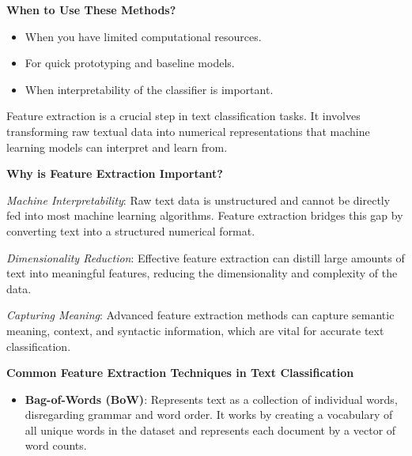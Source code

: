 \documentclass[
  letterpaper,
  DIV=11,
  numbers=noendperiod]{scrreprt}
\providecommand{\tightlist}{%
  \setlength{\itemsep}{0pt}\setlength{\parskip}{0pt}}\usepackage{longtable,booktabs,array}
\begin{document}
\textbf{When to Use These Methods?}

\begin{itemize}
\tightlist
\item
  When you have limited computational resources.
\item
  For quick prototyping and baseline models.
\item
  When interpretability of the classifier is important.
\end{itemize}

\begin{tcolorbox}[enhanced jigsaw, opacitybacktitle=0.6, breakable, title=\textcolor{quarto-callout-note-color}{\faInfo}\hspace{0.5em}{On Feature Extraction}, arc=.35mm, colframe=quarto-callout-note-color-frame, colbacktitle=quarto-callout-note-color!10!white, left=2mm, bottomrule=.15mm, opacityback=0, toprule=.15mm, bottomtitle=1mm, toptitle=1mm, titlerule=0mm, leftrule=.75mm, colback=white, rightrule=.15mm, coltitle=black]

Feature extraction is a crucial step in text classification tasks. It
involves transforming raw textual data into numerical representations
that machine learning models can interpret and learn from.

\textbf{Why is Feature Extraction Important?}

\emph{Machine Interpretability}: Raw text data is unstructured and
cannot be directly fed into most machine learning algorithms. Feature
extraction bridges this gap by converting text into a structured
numerical format.

\emph{Dimensionality Reduction}: Effective feature extraction can
distill large amounts of text into meaningful features, reducing the
dimensionality and complexity of the data.

\emph{Capturing Meaning}: Advanced feature extraction methods can
capture semantic meaning, context, and syntactic information, which are
vital for accurate text classification.

\textbf{Common Feature Extraction Techniques in Text Classification}

\begin{itemize}
\tightlist
\item
  \textbf{Bag-of-Words (BoW)}: Represents text as a collection of
  individual words, disregarding grammar and word order. It works by
  creating a vocabulary of all unique words in the dataset and
  represents each document by a vector of word counts.


\end{itemize}
\end{tcolorbox}
\end{document}
